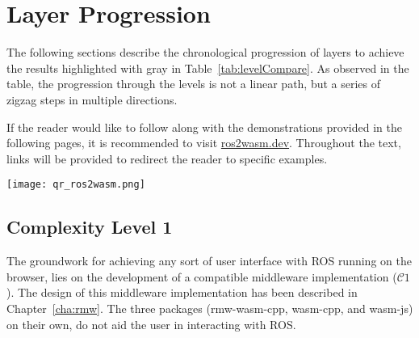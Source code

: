 \section{Layer Progression}

    The following sections describe the chronological progression of layers to achieve the results highlighted with gray in Table~\ref{tab:levelCompare}. As observed in the table, the progression through the levels is not a linear path, but a series of zigzag steps in multiple directions.

    \vspace{1em}
    \begin{tcolorbox}[title=Note]
        \begin{minipage}[t]{0.87\linewidth}
            \vspace*{0pt}
            If the reader would like to follow along with the demonstrations
            provided in the following pages, it is recommended to visit 
            \href{https://ros2wasm.dev/}{\textsf{ros2wasm.dev}}.
            Throughout the text, links will be provided to redirect the reader 
            to specific examples.
        \end{minipage}\hfill%
        \begin{minipage}[t]{0.1\linewidth}
            \vspace*{0pt}
            \texttt{[image: qr\_ros2wasm.png]}
        \end{minipage}
    \end{tcolorbox}


        \subsection{Complexity Level 1}

        The groundwork for achieving any sort of user interface with \ac{ROS} running on the browser, lies on the development of a compatible middleware implementation ($\mathcal{C}1$). The design of this middleware implementation has been described in Chapter~\ref{cha:rmw}. The three packages (\textsf{rmw-wasm-cpp}, \textsf{wasm-cpp}, and \textsf{wasm-js}) on their own, do not aid the user in interacting with \ac{ROS}.

